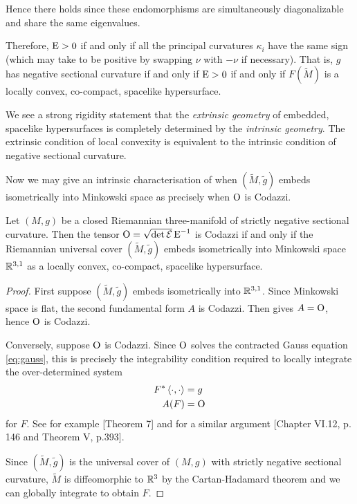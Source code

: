 \documentclass[a4paper,12pt]{amsart}
\begin{document}
Hence there holds
since these endomorphisms are simultaneously diagonalizable and share the same eigenvalues.

Therefore, \(\operatorname{E} > 0\) if and only if all the principal curvatures \(\kappa_i\) have the same sign (which may take to be positive by swapping \(\nu\) with \(-\nu\) if necessary). That is, \(g\) has negative sectional curvature if and only if \(\operatorname{E} > 0\) if and only if \(F(\tilde{M})\) is a locally convex, co-compact, spacelike hypersurface.

\begin{rem}
We see a strong rigidity statement that the \emph{extrinsic geometry} of embedded, spacelike hypersurfaces is completely determined by the \emph{intrinsic geometry}. The extrinsic condition of local convexity is equivalent to the intrinsic condition of negative sectional curvature.
\end{rem}

Now we may give an intrinsic characterisation of when \((\tilde{M}, \tilde{g})\) embeds isometrically into Minkowski space as precisely when \(\operatorname{O}\) is Codazzi.

\begin{thm}
\label{thm:intg_embed}

Let \((M, g)\) be a closed Riemannian three-manifold of strictly negative sectional curvature. Then the tensor \(\operatorname{O} = \sqrt{\det \operatorname{\mathcal{E}}} \operatorname{E}^{-1}\) is Codazzi if and only if the Riemannian universal cover \((\tilde{M}, \tilde{g})\) embeds isometrically into Minkowski space \(\mathbb{R}^{3,1}\) as a locally convex, co-compact, spacelike hypersurface.
\end{thm}

\begin{proof}
First suppose \((\tilde{M}, \tilde{g})\) embeds isometrically into \(\mathbb{R}^{3,1}\). Since Minkowski space is flat, the second fundamental form \(A\) is Codazzi. Then  gives \(A = \operatorname{O}\), hence \(\operatorname{O}\) is Codazzi.

Conversely, suppose \(\operatorname{O}\) is Codazzi. Since $\operatorname{O}$ solves the contracted Gauss equation \eqref{eq:gauss}, this is precisely the integrability condition required to locally integrate the over-determined system
\begin{align*}
F^{\ast} \left\langle \cdot,\cdot \right\rangle &= g \\
A(F) &= \operatorname{O}
\end{align*}
for \(F\). See for example \cite{MR1713298}[Theorem 7] and for a similar argument \cite{MR1013365}[Chapter VI.12, p. 146 and Theorem V, p.393].

Since \((\tilde{M}, \tilde{g})\) is the universal cover of \((M, g)\) with strictly negative sectional curvature, \(\tilde{M}\) is diffeomorphic to \(\mathbb{R}^3\) by the Cartan-Hadamard theorem and we can globally integrate to obtain \(F\).
\end{proof}
\end{document}
